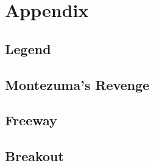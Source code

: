 \documentclass[draft,final]{vutinfth} %
\begin{document}
    \backmatter
    \listoffigures %

    \cleardoublepage %
    \listoftables %

    \listofalgorithms

    \printindex

    \printglossaries

    
    


    \chapter*{Appendix}\label{ch:appendix}
    \section*{Legend}
    \section*{Montezuma's Revenge}
    \section*{Freeway}
    \section*{Breakout}

\end{document}
